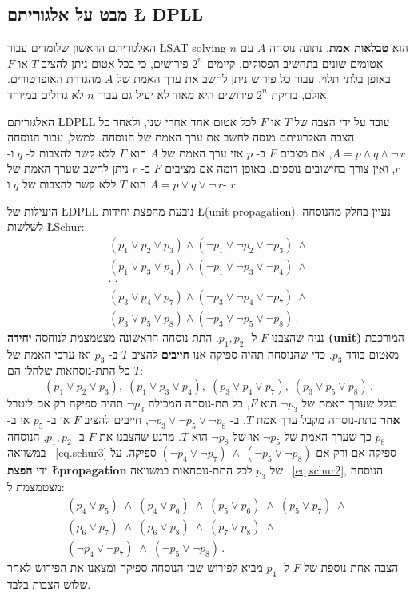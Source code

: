 \subsection{מבט על אלגוריתם \L{ DPLL}}

האלגוריתם הראשון שלומדים עבור
\L{SAT solving}
הוא
\textbf{טבלאות אמת}.
נתונה נוסחה 
$A$
עם 
$n$
אטומים שונים בתחשיב הפסוקים, קיימים
$2^n$
פירושים, כי בכל אטום ניתן להציב
$T$
או
$F$
באופן בלתי תלוי. עבור כל פירוש ניתן לחשב את ערך האמת של
$A$
מהגדרת האופרטורים. אולם, בדיקת
$2^n$
פירושים היא מאוד לא יעיל גם עבור
$n$
לא גדולים במיוחד.

האלגוריתם
\L{DPLL}
עובד על ידי הצבה של
$T$
או
$F$
לכל אטום אחד אחרי שני, ולאחר כל הצבה האלרוגיתם מנסה לחשב את ערך האמת של הנוסחה. למשל, עבור הנוסחה
$A=p \wedge q \wedge \neg\, r$,
אם מצבים
$F$
ב-%
$p$
אזי ערך האמת של
$A$
הוא
$F$
ללא קשר להצבות ל-%
$q$
ו-%
$r$,
ואין צורך בחישובים נוספים. באופן דומה אם מציבים 
$F$
ב-%
$r$
ניתן לחשב שערך האמת של 
$A=p\vee q \vee \neg\, r$
הוא 
$T$
ללא קשר להצבות של
$q$
ו-%
$r$.

היעילות של
\L{DPLL}
נובעת מהפצת יחידות 
\L{(unit propagation)}.
נעיין בחלק מהנוסחה לשלשות
\L{Schur}:
\begin{equation}
\begin{array}{l}\label{eq.schur3}
(p_1 \vee p_2 \vee p_3) \wedge (\neg p_1 \vee \neg p_2 \vee \neg p_3) \:\wedge \\
(p_1 \vee p_3 \vee p_4) \wedge (\neg p_1 \vee \neg p_3 \vee \neg p_4) \:\wedge \\
\cdots\\
(p_3 \vee p_4 \vee p_7) \wedge (\neg p_3 \vee \neg p_4 \vee \neg p_7) \:\wedge \\
(p_3 \vee p_5 \vee p_8) \wedge (\neg p_3 \vee \neg p_5 \vee \neg p_8)\,.
\end{array}
\end{equation}
נניח שהצבנו
$F$
ל-%
$p_1,p_2$.
התת-נוסחה הראשונה מצטמצמת לנוחסה
\textbf{יחידה (unit)}
המורכבת מאטום בודד
$p_3$.
כדי שהנוסחה תהיה ספיקה אנו
\textbf{חייבים}
להציב 
$T$
ב-%
$p_3$
ואז ערכי האמת של כל התת-נוסחאות שלהלן הם
$T$:
\[
(p_1 \vee p_2 \vee p_3),\;(p_1 \vee p_3 \vee p_4),\;
(p_3 \vee p_4 \vee p_7),\;(p_3 \vee p_5 \vee p_8)\,.
\]
בגלל שערך האמת של
$\neg p_3$
הוא
$F$,
כל תת-נוסחה המכילה 
$\neg p_3$
תהיה ספיקה רק אם ליטרל
\textbf{אחר}
בתת-נוסחה מקבל ערך אמת
$T$.
ב-%
$\neg p_3 \vee \neg p_5 \vee \neg p_8$, 
חייבים להציב
$F$
או ב-%
$p_5$
או ב-%
$p_8$
כך שערך האמת של
$\neg p_5$
או של
$\neg p_8$
הוא
$T$.
מרגע שהצבנו את
$F$
ב-%
$p_1,p_2$,
הנוסחה במשוואה
~\ref{eq.schur3}
ספיקה אם ורק אם 
$(\neg p_4 \vee \neg p_7) \:\wedge\: (\neg p_5 \vee \neg p_8)$
ספיקה. על ידי
\textbf{הפצת \L{propagation}}
של
$p_3$
לכל התת-נוסחאות במשוואה%
~\ref{eq.schur2}, 
הנוסחה מצטמצמת ל:
\[
\begin{array}{l}
(p_4\vee p_5)\;\wedge\;(p_4\vee p_6)\;\wedge\;(p_5\vee p_6)\;\wedge\;(p_5\vee p_7)\;\wedge\;\\
(p_6\vee p_7)\;\wedge\;(p_6\vee p_8)\;\wedge\;(p_7\vee p_8)\;\wedge\\
(\neg p_4\vee \neg p_7)\;\wedge\;
(\neg p_5\vee \neg p_8)\,.
\end{array}
\]
הצבה אחת נוספת של
$F$
ל-%
$p_4$
מביא לפירוש שבו הנוסחה ספיקה ומצאנו את הפירוש לאחר שלוש הצבות בלבד.

